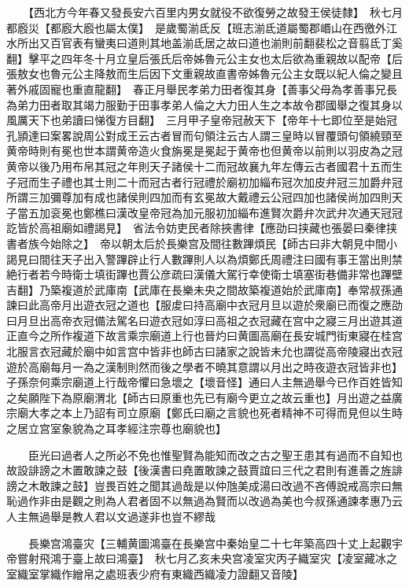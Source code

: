 　　【西北方今年春又發長安六百里内男女就役不欲復勞之故發王侯徒隸】　秋七月都廏災【都廏大廏也屬太僕】　是歲蜀湔氐反【班志湔氐道屬蜀郡㟭山在西徼外江水所出又百官表有蠻夷曰道則其地盖湔氐居之故曰道也湔則前翻裴松之音翦氐丁奚翻】擊平之四年冬十月立皇后張氏后帝姊魯元公主女也太后欲為重親故以配帝【后張敖女也魯元公主降敖而生后因下文重親故直書帝姊魯元公主女既以紀人倫之變且著外戚固寵也重直龍翻】　春正月舉民孝弟力田者復其身【善事父母為孝善事兄長為弟力田者取其竭力服勤于田事孝弟人倫之大力田人生之本故令郡國舉之復其身以風厲天下也弟讀曰悌復方目翻】　三月甲子皇帝冠赦天下【帝年十七即位至是始冠孔頴達曰案畧說周公對成王云古者冒而句領注云古人謂三皇時以冒覆頭句領繞頸至黄帝時則有冕也世本謂黄帝造火食旃冕是冕起于黄帝也但黄帝以前則以羽皮為之冠黄帝以後乃用布帛其冠之年則天子諸侯十二而冠故襄九年左傳云古者國君十五而生子冠而生子禮也其士則二十而冠古者行冠禮於廟初加緇布冠次加皮弁冠三加爵弁冠所謂三加彌尊加有成也諸侯則四加而有玄冕故大戴禮云公冠四加也諸侯尚加四則天子當五加衮冕也鄭樵曰漢改皇帝冠為加元服初加緇布進賢次爵弁次武弁次通天冠冠訖皆於高祖廟如禮謁見】　省法令妨吏民者除挾書律【應劭曰挟藏也張晏曰秦律挟書者族今始除之】　帝以朝太后於長樂宫及間往數蹕煩民【師古曰非大朝見中間小謁見曰間往天子出入警蹕辟止行人數蹕則人以為煩鄭氏周禮注曰國有事王當出則禁絶行者若今時衛士填街蹕也賈公彦疏曰漢儀大駕行幸使衛士填塞街巷備非常也蹕壁吉翻】乃築複道於武庫南【武庫在長樂未央之間故築複道始於武庫南】奉常叔孫通諫曰此高帝月出遊衣冠之道也【服䖍曰持高廟中衣冠月旦以遊於衆廟已而復之應劭曰月旦出高帝衣冠備法駕名曰遊衣冠如淳曰高祖之衣冠藏在宫中之寢三月出遊其道正直今之所作複道下故言乘宗廟道上行也晉灼曰黄圖高廟在長安城門街東寢在桂宫北服言衣冠藏於廟中如言宫中皆非也師古曰諸家之說皆未允也謂從高帝陵寢出衣冠遊於高廟每月一為之漢制則然而後之學者不曉其意謂以月出之時夜遊衣冠皆非也】子孫奈何乘宗廟道上行哉帝懼曰急壞之【壞音怪】通曰人主無過舉今已作百姓皆知之矣願陛下為原廟渭北【師古曰原重也先已有廟今更立之故云重也】月出遊之益廣宗廟大孝之本上乃詔有司立原廟【鄭氏曰廟之言貌也死者精神不可得而見但以生時之居立宫室象貌為之耳孝經注宗尊也廟貌也】

　　臣光曰過者人之所必不免也惟聖賢為能知而改之古之聖王患其有過而不自知也故設誹謗之木置敢諫之鼓【後漢書曰堯置敢諫之鼓賈誼曰三代之君則有進善之旌誹謗之木敢諫之鼓】豈畏百姓之聞其過哉是以仲虺美成湯曰改過不吝傅說戒高宗曰無恥過作非由是觀之則為人君者固不以無過為賢而以改過為美也今叔孫通諫孝惠乃云人主無過舉是教人君以文過遂非也豈不繆哉

　　長樂宫鴻臺灾【三輔黄圖鴻臺在長樂宫中秦始皇二十七年築高四十丈上起觀宇帝嘗射飛鴻于臺上故曰鴻臺】　秋七月乙亥未央宫凌室灾丙子織室灾【凌室藏冰之室織室掌織作繒帛之處班表少府有東織西織凌力證翻又音陵】

